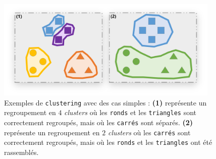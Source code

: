 		\begin{figure}[H]
			\centering
			\includegraphics[width=0.95\textwidth]{figures/annexe-vmeasure-cas-simples}
			\caption{
				Exemples de \texttt{clustering} avec des cas simples :
				\textbf{(1)} représente un regroupement en $4$ \textit{clusters} où les \texttt{ronds} et les \texttt{triangles} sont correctement regroupés, mais où les \texttt{carrés} sont séparés.
				\textbf{(2)} représente un regroupement en $2$ \textit{clusters} où les \texttt{carrés} sont correctement regroupés, mais où les \texttt{ronds} et les \texttt{triangles} ont été rassemblés.
			}
			\label{figure:D.2-ANNEXE-EVALUATION-CLUSTERING-EXEMPLE-VMEASURE-2-CAS-SIMPLES}
		\end{figure}
		
